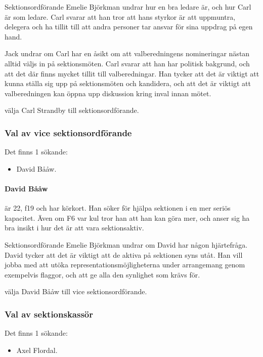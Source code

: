 \documentclass[hidelinks]{sektionsmote}
\begin{document}
Sektionsordförande Emelie Björkman undrar hur en bra ledare är, och hur Carl är som ledare.
Carl svarar att han tror att hans styrkor är att uppmuntra, delegera och ha tillit till att andra personer tar ansvar för sina uppdrag på egen hand.

Jack undrar om Carl har en åsikt om att valberedningens nomineringar nästan alltid väljs in på sektionsmöten.
Carl svarar att han har politisk bakgrund, och att det där finns mycket tillit till valberedningar.
Han tycker att det är viktigt att kunna ställa sig upp på sektionsmöten och kandidera, och att det är viktigt att valberedningen kan öppna upp diskussion kring inval innan mötet.

\begin{beslut}
  \item välja Carl Strandby till sektionsordförande.
\end{beslut}

\subsubsection{Val av vice sektionsordförande}
Det finns 1 sökande:
\begin{itemize}
    \item David Bååw.
\end{itemize}

\paragraph{David Bååw} är 22, f19 och har körkort.
Han söker för hjälpa sektionen i en mer seriös kapacitet.
Även om F6 var kul tror han att han kan göra mer, och anser sig ha bra insikt i hur det är att vara sektionsaktiv.

Sektionsordförande Emelie Björkman undrar om David har någon hjärtefråga.
David tycker att det är viktigt att de aktiva på sektionen syns utåt.
Han vill jobba med att utöka representationsmöjligheterna under arrangemang genom exempelvis flaggor, och att ge alla den synlighet som krävs för.

\begin{beslut}
  \item välja David Bååw till vice sektionsordförande.
\end{beslut}

\subsubsection{Val av sektionskassör}
Det finns 1 sökande:
\begin{itemize}
    \item Axel Flordal.
\end{itemize}
\end{document}
